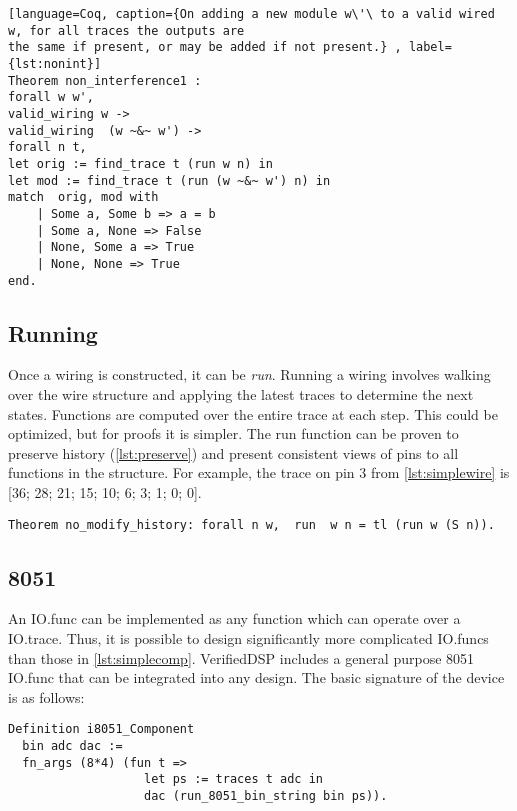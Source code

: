 \documentclass[preprint,12pt]{sigplanconf}
\begin{document}
\begin{lstlisting}[language=Coq, caption={On adding a new module w\'\ to a valid wired w, for all traces the outputs are
the same if present, or may be added if not present.} , label={lst:nonint}]
Theorem non_interference1 :
forall w w', 
valid_wiring w ->
valid_wiring  (w ~&~ w') ->
forall n t,
let orig := find_trace t (run w n) in
let mod := find_trace t (run (w ~&~ w') n) in
match  orig, mod with
    | Some a, Some b => a = b
    | Some a, None => False
    | None, Some a => True
    | None, None => True
end.
\end{lstlisting}

\subsection{Running}\label{subsec:running}
Once a wiring is constructed, it can be \emph{run}. Running a wiring
involves walking over the wire structure and applying the latest
traces to determine the next states. Functions are computed over the
entire trace at each step. This could be optimized, but for proofs it
is simpler. The run function can be proven to preserve history (\autoref{lst:preserve}) and
present consistent views of pins to all functions in the structure.
For example, the trace on pin 3 from \autoref{lst:simplewire} is 
 [36; 28; 21; 15; 10; 6; 3; 1; 0; 0].
 

\begin{lstlisting}[language=Coq, label={lst:preserve}, caption={The
next run is identical up to the latest result}]
Theorem no_modify_history: forall n w,  run  w n = tl (run w (S n)).
\end{lstlisting}


  
\subsection{8051}\label{subsec:8051}

An IO.func can be implemented as any function which can operate over a IO.trace.
Thus, it is possible to design significantly more complicated IO.funcs
than those in \autoref{lst:simplecomp}. VerifiedDSP includes a general purpose 8051 IO.func that can be integrated
into any design. The basic signature of the device is as follows:

\begin{lstlisting}[language=Coq, caption={The adc and dac provide
conversions to and from the networks type, the bin is a list of
bytes to be loaded into code memory. The 8051's ports must all be connected. First the program is loaded into
memory, then the component can be executed over any set of 32 pin
traces. There is only one output pin, but as noted earlier duplicate
devices can be used to simulate multiple output pins.}]
Definition i8051_Component 
  bin adc dac :=
  fn_args (8*4) (fun t =>
                   let ps := traces t adc in
                   dac (run_8051_bin_string bin ps)).
\end{lstlisting}
\end{document}
